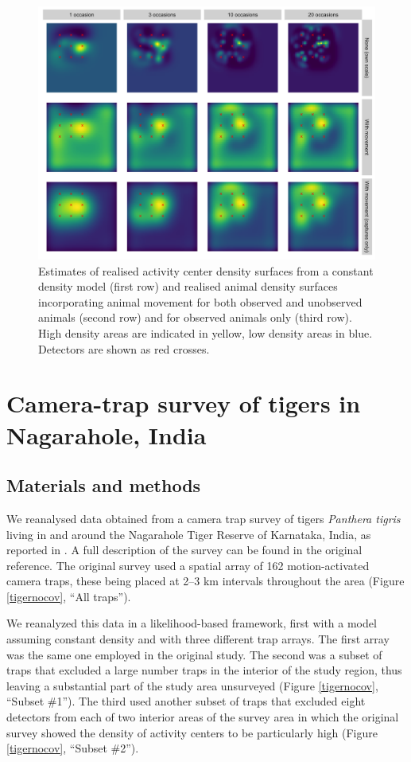 \documentclass[10pt,a4paper]{article}
\begin{document}
\begin{figure}[htbp]
\centering
\includegraphics[width=1\textwidth]{mona_with_movement.png}
\caption{Estimates of realised activity center density surfaces from a constant density model (first row) and realised animal density surfaces incorporating animal movement for both observed and unobserved animals (second row) and for observed animals only (third row). High density areas are indicated in yellow, low density areas in blue. Detectors are shown as red crosses.}
\label{move}
\end{figure}


\section{Camera-trap survey of tigers in Nagarahole, India}

\subsection{Materials and methods}
We reanalysed data obtained from a camera trap survey of tigers {\it Panthera tigris} living in and around the Nagarahole Tiger Reserve of Karnataka, India, as reported in \cite{Dorazio+Royle:03}. A full description of the survey can be found in the original reference. The original survey used a spatial array of 162 motion-activated camera traps, these being placed at 2–3 km intervals throughout the area (Figure \ref{tigernocov}, ``All traps''). 

We reanalyzed this data in a likelihood-based framework, first with a model assuming constant density and with three different trap arrays. The first array was the same one employed in the original study. The second was a subset of traps that excluded a large number traps in the interior of the study region, thus leaving a substantial part of the study area unsurveyed (Figure \ref{tigernocov}, ``Subset \#1''). The third used another subset of traps that excluded eight detectors from each of two interior areas of the survey area in which the original survey showed the density of activity centers to be particularly high (Figure \ref{tigernocov}, ``Subset \#2''). 
\end{document}
